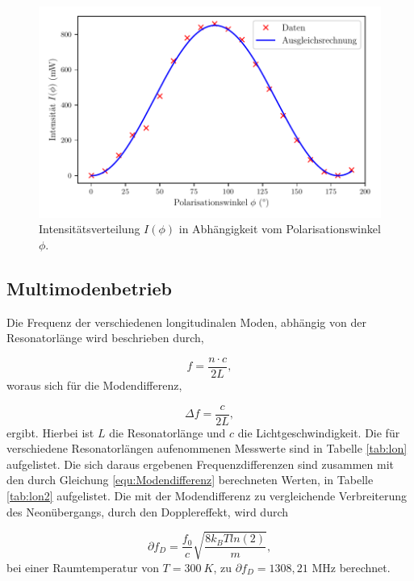 \begin{figure}[H]
  \centering
  \includegraphics[scale=0.65]{pol.pdf}
  \vspace{-10pt}
  \caption{Intensitätsverteilung $I(\phi)$ in Abhängigkeit vom Polarisationswinkel $\phi$.}
  \label{fig:pol}
\end{figure}



\subsection{Multimodenbetrieb}
\label{sec:Multimodenbetrieb}
Die Frequenz der verschiedenen longitudinalen Moden, abhängig von der Resonatorlänge wird beschrieben durch,

\begin{equation}
\label{equ:}
  f = \frac{n \cdot c}{2L},
\end{equation}
 woraus sich für die Modendifferenz,

 \begin{equation}
\label{equ:Modendifferenz}
  \Delta f = \frac{c}{2L},
\end{equation}
ergibt. Hierbei ist $L$ die Resonatorlänge und $c$ die Lichtgeschwindigkeit.
Die für verschiedene Resonatorlängen aufenommenen Messwerte sind in Tabelle \ref{tab:lon} aufgelistet. 
Die sich daraus ergebenen Frequenzdifferenzen sind zusammen mit den durch Gleichung \eqref{equ:Modendifferenz} berechneten Werten, in Tabelle \ref{tab:lon2} aufgelistet.
Die mit der Modendifferenz zu vergleichende Verbreiterung des Neonübergangs, durch den Dopplereffekt, wird durch 

\begin{equation}
  \partial f_D = \frac{f_0}{c} \sqrt{\frac{8 k_B T ln(2)}{m}},
\end{equation}
bei einer Raumtemperatur von $T=300 \: K$, zu 
$\partial f_D = 1308,21$ MHz
berechnet. 


